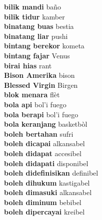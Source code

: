 \textbf{ bilik mandi  } baño \\
\textbf{ bilik tidur  } kamber \\
\textbf{ binatang buas  } bestia \\
\textbf{ binatang liar  } pushi \\
\textbf{ bintang berekor  } kometa \\
\textbf{ bintang fajar  } Venus \\
\textbf{ birai hias  } rant \\
\textbf{ Bison Amerika  } bison \\
\textbf{ Blessed Virgin  } Birgen \\
\textbf{ blok menara  } flèt \\
\textbf{ bola api  } bol’i fuego \\
\textbf{ bola berapi  } bol’i fuego \\
\textbf{ bola keranjang  } basketbòl \\
\textbf{ boleh bertahan  } sufri \\
\textbf{ boleh dicapai  } alkansabel \\
\textbf{ boleh didapat  } accesibel \\
\textbf{ boleh didapati  } disponibel \\
\textbf{ boleh didefinisikan  } definibel \\
\textbf{ boleh dihukum  } kastigabel \\
\textbf{ boleh dimasuki  } alkansabel \\
\textbf{ boleh diminum  } bebibel \\
\textbf{ boleh dipercayai  } kreibel \\
